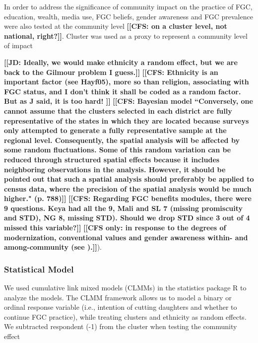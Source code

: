 \documentclass[12pt,]{article}
\newcommand{\comment}[1]{\textbf{[[#1]]}}
\newcommand{\cfcmt}[1]{\comment{CFS: #1}}
\newcommand{\cfonly}[1]{\comment{CFS only: #1}}
\newcommand{\jdcmt}[1]{\comment{JD: #1}}
\begin{document}
In order to address the significance of community impact on the practice of FGC, education, wealth, media use, FGC beliefs, gender awareness and FGC prevalence were also tested at the community level \cfcmt{on a cluster level, not national, right?}.  Cluster  was used as a proxy to represent a community level of impact \cite{AligRen06, Hayf05, Krav02}

\jdcmt{Ideally, we would make ethnicity a random effect, but we are back to the Gilmour problem I guess.} \cfcmt{Ethnicity is an important factor (see Hayf05), more so than religion, associating with FGC status, and I don't think it shall be coded as a random factor.  But as J said, it is too hard! } %
\cfcmt{Bayesian model \cite{KandNwak09} ``Conversely, one cannot assume that the clusters selected in each district are fully representative of the states in which they are located because surveys only attempted to generate a fully representative sample at the regional level. Consequently, the spatial analysis will be affected by some random fluctuations.  Some of this random variation can be reduced through structured spatial effects because it includes neighboring observations in the analysis. However, it should be pointed out that such a spatial analysis should preferably be applied to census data, where the precision of the spatial analysis would be much higher." (p. 788)}
\cfcmt{Regarding FGC benefits modules, there were 9 questions.  Keya had all the 9, Mali and SL 7 (missing promiscuity and STD), NG 8, missing STD).  Should we drop STD since 3 out of 4 missed this variable?}
\cfonly {in response to the degrees of modernization, conventional values and gender awareness within- and among-community (see \cite{Achi14, BoylMcMo02, Hayf05, KandNwak09, ModrLiu13, Moor13, OdukAfol17, Youn02}).}).  

\subsubsection{Statistical Model}\label{statistical-model}

We used cumulative link mixed models (CLMMs) in the statistics package R \cite{Rstats,Rpackage_ordinal} to analyze the models.  The CLMM framework allows us to model a binary or ordinal response variable (i.e., intention of cutting daughters and whether to continue FGC practice), while treating clusters and ethnicity as random effects.  
We subtracted respondent (-1) from the cluster when testing the community effect 
\end{document}
